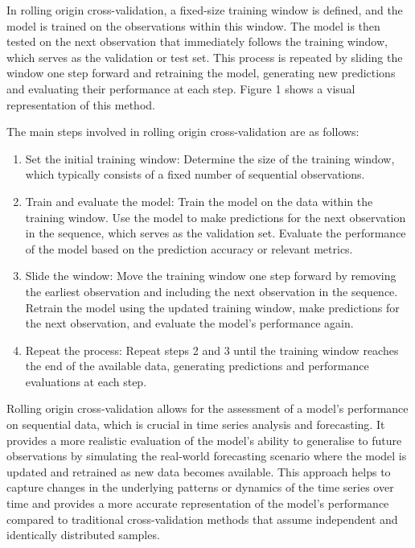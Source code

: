 \documentclass[
]{article}
\begin{document}
In rolling origin cross-validation, a fixed-size training window is
defined, and the model is trained on the observations within this
window. The model is then tested on the next observation that
immediately follows the training window, which serves as the validation
or test set. This process is repeated by sliding the window one step
forward and retraining the model, generating new predictions and
evaluating their performance at each step. Figure 1 shows a visual
representation of this method.

The main steps involved in rolling origin cross-validation are as
follows:~

\begin{enumerate}
\def\labelenumi{\arabic{enumi}.}
\item
  Set the initial training window: Determine the size of the training
  window, which typically consists of a fixed number of sequential
  observations.~
\item
  Train and evaluate the model: Train the model on the data within the
  training window. Use the model to make predictions for the next
  observation in the sequence, which serves as the validation set.
  Evaluate the performance of the model based on the prediction accuracy
  or relevant metrics.~
\item
  Slide the window: Move the training window one step forward by
  removing the earliest observation and including the next observation
  in the sequence. Retrain the model using the updated training window,
  make predictions for the next observation, and evaluate the model's
  performance again.~
\item
  Repeat the process: Repeat steps 2 and 3 until the training window
  reaches the end of the available data, generating predictions and
  performance evaluations at each step.~
\end{enumerate}

Rolling origin cross-validation allows for the assessment of a model's
performance on sequential data, which is crucial in time series analysis
and forecasting. It provides a more realistic evaluation of the model's
ability to generalise to future observations by simulating the
real-world forecasting scenario where the model is updated and retrained
as new data becomes available. This approach helps to capture changes in
the underlying patterns or dynamics of the time series over time and
provides a more accurate representation of the model's performance
compared to traditional cross-validation methods that assume independent
and identically distributed samples.
\end{document}
